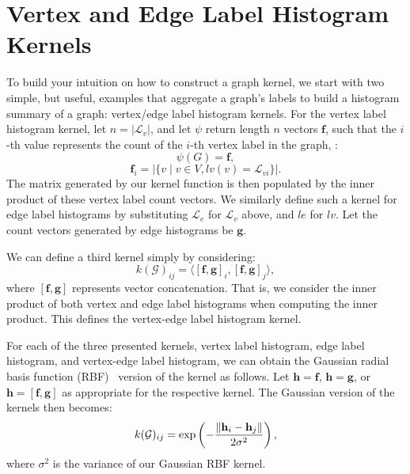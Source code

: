 \section{Vertex and Edge Label Histogram Kernels}
\label{appendix:graph_kernels:histogram}

To build your intuition on how to construct a graph kernel, we start with two
simple, but useful, examples that aggregate a graph's labels to build a
histogram summary of a graph: vertex/edge label histogram kernels. For the
vertex label histogram kernel, let $n=|\mathcal{L}_v|$, and let $\psi$ return
length $n$ vectors $\mathbf{f}$, such that the $i$-th value represents the count
of the $i$-th vertex label in the graph, \ie: 
\begin{equation}
    \psi(G) = \mathbf{f},
\end{equation}
\begin{equation}
    \mathbf{f}_i=|\{v \mid v \in V, lv(v) = \mathcal{L}_{vi}\}|.
\end{equation}
%
The matrix generated by our kernel function is then populated by the inner
product of these vertex label count vectors.
We similarly define such a kernel for edge label histograms by substituting
$\mathcal{L}_e$ for $\mathcal{L}_v$ above, and $le$ for $lv$. Let the count
vectors generated by edge histograms be $\mathbf{g}$.

We can define a third kernel simply by considering:
\begin{equation}
    k(\mathcal{G})_{ij} = \langle[\mathbf{f},\mathbf{g}]_i, [\mathbf{f},\mathbf{g}]_j\rangle,
\end{equation}
%
where $[\mathbf{f},\mathbf{g}]$ represents vector concatenation. That is, we
consider the inner product of both vertex and edge label histograms when
computing the inner product. This defines the vertex-edge label histogram
kernel.

For each of the three presented kernels, vertex label histogram, edge label
histogram, and vertex-edge label histogram, we can obtain the Gaussian radial
basis function (RBF)~\cite{buhmann_2000} version of the kernel as follows. Let
$\mathbf{h} = \mathbf{f}$, $\mathbf{h} = \mathbf{g}$, or $\mathbf{h} =
\mathbf{[\mathbf{f}, \mathbf{g}]}$ as appropriate for the respective kernel. The
Gaussian version of the kernels then becomes:
\begin{equation}
    k(\mathcal{G})_{ij} = \text{exp}\left(-\frac{\lVert\mathbf{h}_i - \mathbf{h}_j\rVert}{2\sigma^2}\right),
\end{equation}
%
where $\sigma^2$ is the variance of our Gaussian RBF kernel.

